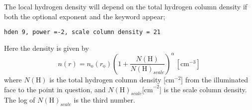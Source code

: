 The local hydrogen density will depend on the total hydrogen column
density if both the optional exponent and the keyword
 appear;
\begin{verbatim}
hden 9, power =-2, scale column density = 21
\end{verbatim}
Here the density is given by
\begin{equation}
n\left( r \right) = n_{\mathrm{o}} \left( {r_{\mathrm{o}} } \right)\left( {1 +
\frac{{N\left( {\mathrm{H}} \right)}}{{N\left( {\mathrm{H}} \right)_{scale} }}}
\right)^\alpha  \, [\mathrm{cm}^{-3}]%
\end{equation}
where $N(\mathrm{H})$ is the total hydrogen column density [cm$^{-2}$] from the illuminated
face to the point in question, and $N(\mathrm{H})_{scale}\mathrm{[cm}^{-2}$] is the scale column
density.
The log of $N(\mathrm{H})_{scale}$ is the third number.

